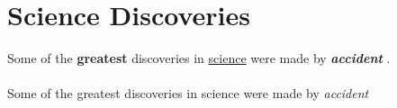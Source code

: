 \documentclass{section}
\begin{document}
	\section{Science Discoveries}
	Some of the \textbf{greatest}
	discoveries in \underline{science}
	were made by 
	\textbf{\textit{accident}} . 
	
	\paragraph{}
	Some of the greatest discoveries in 
	science were made by \emph{accident}
	
\end{document}
